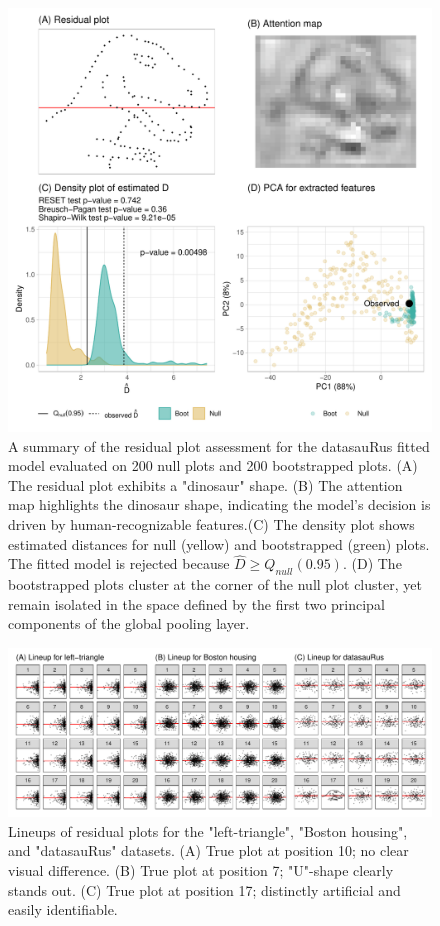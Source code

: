 \documentclass[]{interact}
\theoremstyle{plain}%
\theoremstyle{definition}
\theoremstyle{remark}
\begin{document}
\begin{figure}[!h]

{\centering \includegraphics[width=0.8\linewidth]{paper_files/figure-latex/dino-check-1} 

}

\caption{A summary of the residual plot assessment for the datasauRus fitted model evaluated on 200 null plots and 200 bootstrapped plots. (A) The residual plot exhibits a "dinosaur" shape. (B) The attention map highlights the dinosaur shape, indicating the model's decision is driven by human-recognizable features.(C) The density plot shows estimated distances for null (yellow) and bootstrapped (green) plots. The fitted model is rejected because $\hat{D} \geq Q_{null}(0.95)$. (D) The bootstrapped plots cluster at the corner of the null plot cluster, yet remain isolated in the space defined by the first two principal components of the global pooling layer.}\label{fig:dino-check}
\end{figure}

\begin{figure}[!h]

{\centering \includegraphics[width=1\linewidth]{paper_files/figure-latex/lineup-1} 

}

\caption{Lineups of residual plots for the "left-triangle", "Boston housing", and "datasauRus" datasets. (A) True plot at position 10; no clear visual difference. (B) True plot at position 7; "U"-shape clearly stands out. (C) True plot at position 17; distinctly artificial and easily identifiable.}\label{fig:lineup}
\end{figure}
\end{document}
